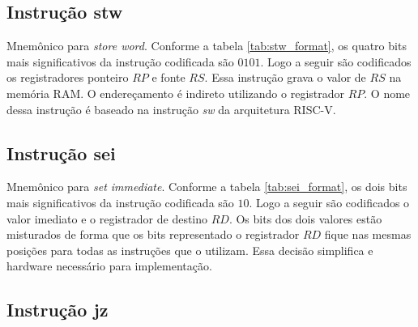 \documentclass[a4paper, 12pt]{article}
\begin{document}
\subsection{Instrução stw}

\begin{table}[ht]
	\centering
	\caption{Formato da instrução codificada \textit{ldw}}
	\label{tab:stw_format}
\end{table}
\par

Mnemônico para \textit{store word}. Conforme a tabela \ref{tab:stw_format}, os 
quatro bits mais significativos da instrução codificada são $0101$.
Logo a seguir são codificados os registradores ponteiro $RP$ e fonte $RS$.
Essa instrução grava o valor de $RS$ na memória RAM.
O endereçamento é indireto utilizando o registrador $RP$.
O nome dessa instrução é baseado na instrução \textit{sw} da arquitetura RISC-V.

\subsection{Instrução sei}

\begin{table}[ht]
	\centering
	\caption{Formato da instrução codificada \textit{sei}}
	\label{tab:sei_format}
\end{table}

\par
Mnemônico para \textit{set immediate}. Conforme a tabela \ref{tab:sei_format}, os 
dois bits mais significativos da instrução codificada são $10$.
Logo a seguir são codificados o valor imediato e o registrador de destino $RD$.
Os bits dos dois valores estão misturados de forma que os bits representado
o registrador $RD$ fique nas mesmas posições para todas as instruções que o utilizam.
Essa decisão simplifica e hardware necessário para implementação.

\subsection{Instrução jz}
\begin{table}[ht]
	\centering
	\caption{Formato da instrução codificada \textit{jz}}
	\label{tab:jz_format}
\end{table}
\end{document}
